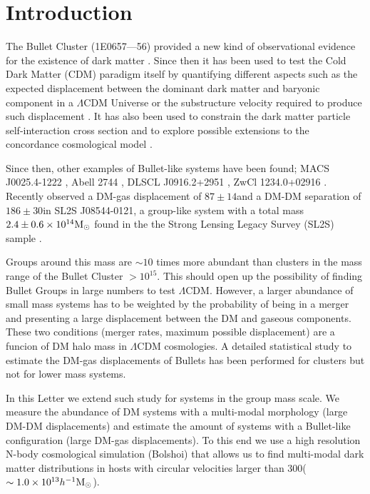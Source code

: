 \documentclass{emulateapj}
\newcommand{\hkpc}{{\ifmmode{h^{-1}{\rm kpc}}\else{$h^{-1}$kpc }\fi}}
\newcommand{\hMsun}{{\ifmmode{h^{-1}{\rm {M_{\odot}}}}\else{$h^{-1}{\rm{M_{\odot}}}$}\fi}}
\newcommand{\Msun}{{\ifmmode{{\rm {M_{\odot}}}}\else{${\rm{M_{\odot}}}$}\fi}}
\newcommand{\kms}{{\ifmmode{{\mathrm{\,km\ s}^{-1}}}\else{\,km~s$^{-1}$}\fi}}
\newcommand{\bulla}{1E0657---56}
\newcommand{\bullg}{SL2S J08544-0121}
\begin{document}


\section{Introduction}


The Bullet Cluster (\bulla) provided a new kind of observational
evidence for the existence of dark matter
\citep{Markevitch2004,Clowe2006}. Since then it has been used to test
the Cold Dark Matter (CDM) paradigm itself by quantifying different
aspects such as the expected displacement between the dominant dark
matter and baryonic component in a $\Lambda$CDM Universe
\citep{ForeroRomero2010} or the substructure velocity required to
produce such displacement \citep{Hayashi2006, Springel2007,
  Thompson2012}. It has also been used to constrain the dark matter
particle self-interaction cross section and to explore possible
extensions to the concordance cosmological model
\citep{Farrar2007,Lee2010,Lee2012}.      
 

Since then, other examples of Bullet-like systems have been found; 
MACS J0025.4-1222 \citep{Bradac2008}, Abell 2744 \citep{Merten2011},
DLSCL J0916.2+2951 \citep{Dawson2012}, ZwCl 1234.0+02916
\citep{Dahle2013}. Recently \citep{Gastaldello} observed a DM-gas
displacement of $87\pm 14$\hkpc and a DM-DM separation of $186\pm
30$\hkpc in \bullg, a group-like system with a total
mass $2.4\pm 0.6 \times 10^{14}\Msun$ found in the the Strong Lensing
Legacy Survey (SL2S) sample \citep{Cabanac2007,More2012}.


Groups around this mass are $\sim10$ times more abundant than clusters
in the mass range of the Bullet Cluster $>10^{15}$\hMsun. This 
should open up the possibility of finding Bullet Groups in large
numbers to test $\Lambda$CDM. However, a larger abundance of small
mass systems has to be weighted by the probability of being in a
merger and  presenting a large displacement between the DM and
gaseous components.  These two conditions (merger rates, maximum
possible displacement) are a funcion of DM halo mass in $\Lambda$CDM
cosmologies.  A detailed statistical study to estimate the DM-gas
displacements of Bullets has been performed for clusters
\citep{ForeroRomero2010} but not for lower mass systems.

In this Letter we extend such study for systems in the group mass
scale. We measure the abundance of DM systems with a multi-modal
morphology (large DM-DM displacements) and estimate the amount of
systems with a Bullet-like configuration  (large DM-gas
displacements). To this end we use a high resolution N-body
cosmological simulation (Bolshoi) that allows us to find multi-modal
dark matter distributions in hosts with circular velocities larger
than $300$\kms ($\sim 1.0\times 10^{13}\hMsun$).
\end{document}
